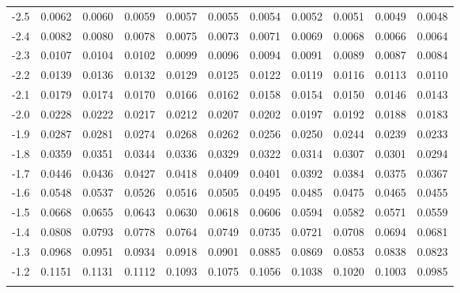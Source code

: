 \begin{tabular}{l|llllllllll}
-2.5 & 0.0062 & 0.0060 & 0.0059 & 0.0057 & 0.0055 & 0.0054 & 0.0052 & 0.0051 & 0.0049 & 0.0048 \\\arrayrulecolor{light-gray}\hline\arrayrulecolor{black} 
-2.4 & 0.0082 & 0.0080 & 0.0078 & 0.0075 & 0.0073 & 0.0071 & 0.0069 & 0.0068 & 0.0066 & 0.0064 \\\arrayrulecolor{light-gray}\hline\arrayrulecolor{black} 
-2.3 & 0.0107 & 0.0104 & 0.0102 & 0.0099 & 0.0096 & 0.0094 & 0.0091 & 0.0089 & 0.0087 & 0.0084 \\\arrayrulecolor{light-gray}\hline\arrayrulecolor{black} 
-2.2 & 0.0139 & 0.0136 & 0.0132 & 0.0129 & 0.0125 & 0.0122 & 0.0119 & 0.0116 & 0.0113 & 0.0110 \\\arrayrulecolor{light-gray}\hline\arrayrulecolor{black} 
-2.1 & 0.0179 & 0.0174 & 0.0170 & 0.0166 & 0.0162 & 0.0158 & 0.0154 & 0.0150 & 0.0146 & 0.0143 \\\arrayrulecolor{light-gray}\hline\arrayrulecolor{black} 
-2.0 & 0.0228 & 0.0222 & 0.0217 & 0.0212 & 0.0207 & 0.0202 & 0.0197 & 0.0192 & 0.0188 & 0.0183 \\\arrayrulecolor{light-gray}\hline\arrayrulecolor{black} 
-1.9 & 0.0287 & 0.0281 & 0.0274 & 0.0268 & 0.0262 & 0.0256 & 0.0250 & 0.0244 & 0.0239 & 0.0233 \\\arrayrulecolor{light-gray}\hline\arrayrulecolor{black} 
-1.8 & 0.0359 & 0.0351 & 0.0344 & 0.0336 & 0.0329 & 0.0322 & 0.0314 & 0.0307 & 0.0301 & 0.0294 \\\arrayrulecolor{light-gray}\hline\arrayrulecolor{black} 
-1.7 & 0.0446 & 0.0436 & 0.0427 & 0.0418 & 0.0409 & 0.0401 & 0.0392 & 0.0384 & 0.0375 & 0.0367 \\\arrayrulecolor{light-gray}\hline\arrayrulecolor{black} 
-1.6 & 0.0548 & 0.0537 & 0.0526 & 0.0516 & 0.0505 & 0.0495 & 0.0485 & 0.0475 & 0.0465 & 0.0455 \\\arrayrulecolor{light-gray}\hline\arrayrulecolor{black} 
-1.5 & 0.0668 & 0.0655 & 0.0643 & 0.0630 & 0.0618 & 0.0606 & 0.0594 & 0.0582 & 0.0571 & 0.0559 \\\arrayrulecolor{light-gray}\hline\arrayrulecolor{black} 
-1.4 & 0.0808 & 0.0793 & 0.0778 & 0.0764 & 0.0749 & 0.0735 & 0.0721 & 0.0708 & 0.0694 & 0.0681 \\\arrayrulecolor{light-gray}\hline\arrayrulecolor{black} 
-1.3 & 0.0968 & 0.0951 & 0.0934 & 0.0918 & 0.0901 & 0.0885 & 0.0869 & 0.0853 & 0.0838 & 0.0823 \\\arrayrulecolor{light-gray}\hline\arrayrulecolor{black} 
-1.2 & 0.1151 & 0.1131 & 0.1112 & 0.1093 & 0.1075 & 0.1056 & 0.1038 & 0.1020 & 0.1003 & 0.0985 \\\arrayrulecolor{light-gray}\hline\arrayrulecolor{black} 

\end{tabular}

